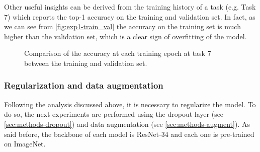 Other useful insights can be derived from the training history of a task (e.g. Task 7) which reports the top-1 accuracy on the training and validation set. In fact, as we can see from \autoref{fig:exp1-train_val} the accuracy on the training set is much higher than the validation set, which is a clear sign of overfitting of the model.

\begin{figure}[H]
    \centering
    \qquad
    \centering
    \caption{Comparison of the accuracy at each training epoch at task 7 between the training and validation set.}%

        \label{fig:exp1-train_val}%
\end{figure}

\newpage
\subsubsection{Regularization and data augmentation}
Following the analysis discussed above, it is necessary to regularize the model.
To do so, the next experiments are performed using the dropout layer (see \autoref{sec:methods-dropout}) and data augmentation (see \autoref{sec:methods-augment}). As said before, the backbone of each model is ResNet-34 and each one is pre-trained on ImageNet.

